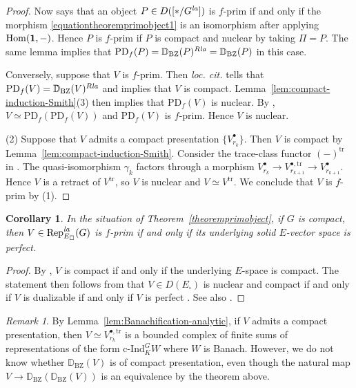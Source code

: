\documentclass[a4paper,10pt]{amsart}
\theoremstyle{remark}
\newtheorem{remark}[theorem]{Remark}
\theoremstyle{definition}
\theoremstyle{plain}
\newtheorem{corollary}[theorem]{Corollary}
\numberwithin{equation}{section}
\newcommand{\bbD}{{\mathbb D}}
\newcommand{\Hom}{{\rm Hom}}
\newcommand{\la}{{\it la}}
\newcommand{\Rep}{{\rm Rep}}
\newcommand{\trace}{\mathrm{tr}}
\newcommand{\cInd}{\mathrm{c\text{-}Ind}}
\newcommand{\BZ}{\ensuremath{\mathrm{BZ}}}
\begin{document}
\begin{proof}
	Now \cite[Lem.~4.4.6]{heyer20246functor} says that an object $P\in D([*/G^{\la}])$ is $f$-prim if and only if the morphism \eqref{equationtheoremprimobject1} is an isomorphism after applying $\Hom(\mathbf{1},-)$. Hence $P$ is $f$-prim if $P$ is compact and nuclear by taking $\Pi=P$. The same lemma implies that $\mathrm{PD}_f(P)=\bbD_{\BZ}(P)^{R\la}=\bbD_{\BZ}(P)$ in this case.

	Conversely, suppose that $V$ is $f$-prim. Then \textit{loc. cit.} tells that $\mathrm{PD}_f(V)=\bbD_{\BZ}(V)^{R\la}$ and \cite[Lem.~4.4.18]{heyer20246functor} implies that $V$ is compact. Lemma~\ref{lem:compact-induction-Smith}(3) then implies that $\mathrm{PD}_f(V)$ is nuclear. By \cite[Lem.~4.4.4]{heyer20246functor}, $V\simeq \mathrm{PD}_f(\mathrm{PD}_f(V))$ and $\mathrm{PD}_f(V)$ is $f$-prim. Hence $V$ is nuclear.

	(2) Suppose that $V$ admits a compact presentation $\{V_{r_k}^{\bullet}\}$. Then $V$ is compact by Lemma~\ref{lem:compact-induction-Smith}. Consider the trace-class functor $(-)^{\trace}$ in \cite[Def.~A.13]{bosco2023rationalpadicHodge}. The quasi-isomorphism $\gamma_k$ factors through a morphism $V_{r_k}^{\bullet}\rightarrow V_{r_{k+1}}^{\bullet,\trace}\rightarrow V_{r_{k+1}}^{\bullet}$. Hence $V$ is a retract of $V^{\trace}$, so $V$ is nuclear and $V\simeq V^{\trace}$. We conclude that $V$ is $f$-prim by (1).
\end{proof}
\begin{corollary}
	In the situation of Theorem~\ref{theoremprimobject}, if $G$ is compact, then $V\in\Rep^{\la}_{E_{\square}}(G)$ is $f$-prim if and only if its underlying solid $E$-vector space is perfect. 
\end{corollary}
\begin{proof}
	By \cite[Prop.~2.37]{mikami2026finiteness}, $V$ is compact if and only if the underlying $E$-space is compact. The statement then follows from that $V\in D(E_{\square})$ is nuclear and compact if and only if $V$ is dualizable if and only if $V$ is perfect \cite[Prop.~5.37, Cor.~5.51.1]{andreychev2021pseudocoherent}. See also \cite[Cor.~6.2.52]{camargo2026locallyanalyticnotes}.
\end{proof}
\begin{remark}
	By Lemma~\ref{lem:Banachification-analytic}, if $V$ admits a compact presentation, then $V\simeq V_{r_k}^{\bullet,\trace}$ is a bounded complex of finite sums of representations of the form $\cInd_K^GW$ where $W$ is Banach. However, we do not know whether $\bbD_{\BZ}(V)$ is of compact presentation, even though the natural map $V\to\bbD_{\BZ}(\bbD_{\BZ}(V))$ is an equivalence by the theorem above. 
\end{remark}
\end{document}
